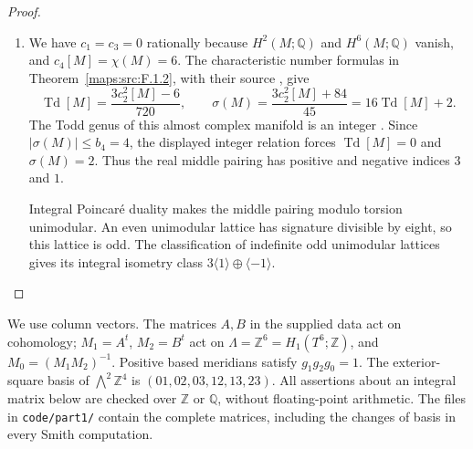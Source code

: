 \documentclass[11pt,a4paper]{article}
\theoremstyle{definition}
\begin{document}
\begin{proof}
\begin{enumerate}[label=\arabic*.]
Over the two-dimensional pair of pants the prescribed boundary
sections of the associated $\mathcal J$-bundle extend over relative
one-cells by connectedness and over relative two-cells by simple
connectivity. Smooth approximation relative to the collars gives
a smooth vertical structure. Horizontal splittings form an affine
space, so a partition of unity extends the prescribed complex
splittings from those collars. Combining the vertical structure with
the pulled-back base structure and gluing the caps gives the required
almost complex structure on $M$.

\item We have $c_1=c_3=0$ rationally because $H^2(M;\mathbb Q)$ and
$H^6(M;\mathbb Q)$ vanish, and $c_4[M]=\chi(M)=6$. The characteristic
number formulas in Theorem~\ref{maps:src:F.1.2}, with their source
\cite[equations (1.2)--(1.4), pp.~3--4]{ffEsoleKang}, give
\[
 \operatorname{Td}[M]=\frac{3c_2^2[M]-6}{720},
 \qquad
 \sigma(M)=\frac{3c_2^2[M]+84}{45}
           =16\operatorname{Td}[M]+2.
\]
The Todd genus of this almost complex manifold is an integer
\cite[Theorem 24.5.4 and corollary, p.~184]{HirzebruchTopologicalMethods}.
Since $|\sigma(M)|\leq b_4=4$, the displayed integer relation forces
$\operatorname{Td}[M]=0$ and $\sigma(M)=2$. Thus the real middle
pairing has positive and negative indices $3$ and $1$.

Integral Poincar\'e duality makes the middle pairing modulo torsion
unimodular. An even unimodular lattice has signature divisible by
eight, so this lattice is odd. The classification of indefinite odd
unimodular lattices
\cite[Theorem 2.2.1, p.~61]{ffPetersSterk} gives its integral isometry
class $3\langle1\rangle\oplus\langle-1\rangle$.
\end{enumerate}
\end{proof}


\label{sec:fourfold}

We use column vectors.  The matrices $A,B$ in the supplied data act on
cohomology; $M_1=A^t$, $M_2=B^t$ act on
$\Lambda=\mathbb Z^6=H_1(T^6;\mathbb Z)$, and
$M_0=(M_1M_2)^{-1}$.  Positive based meridians satisfy
$g_1g_2g_0=1$.  The exterior-square basis of $\bigwedge^2\mathbb Z^4$
is $(01,02,03,12,13,23)$.  All assertions about an integral matrix below
are checked over $\mathbb Z$ or $\mathbb Q$, without floating-point
arithmetic.  The files in \texttt{code/part1/} contain the complete
matrices, including the changes of basis in every Smith computation.
\end{document}
